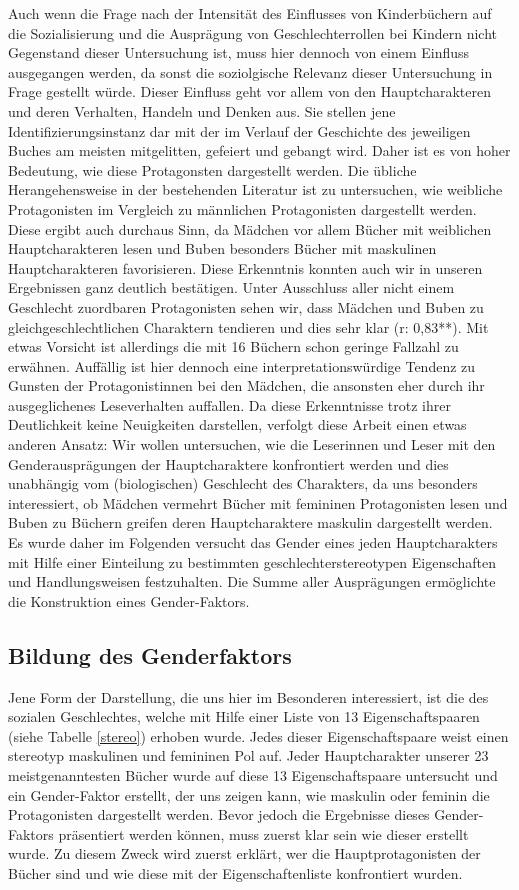 Auch wenn die Frage nach der Intensität des Einflusses von Kinderbüchern
auf die Sozialisierung und die Ausprägung von Geschlechterrollen bei
Kindern nicht Gegenstand dieser Untersuchung ist, muss hier dennoch von
einem Einfluss ausgegangen werden, da sonst die soziolgische Relevanz
dieser Untersuchung in Frage gestellt würde. Dieser Einfluss geht vor
allem von den Hauptcharakteren und deren Verhalten, Handeln und Denken
aus. Sie stellen jene Identifizierungsinstanz dar mit der im Verlauf der
Geschichte des jeweiligen Buches am meisten mitgelitten, gefeiert und
gebangt wird. Daher ist es von hoher Bedeutung, wie diese Protagonsten
dargestellt werden. Die übliche Herangehensweise in der bestehenden
Literatur ist zu untersuchen, wie weibliche Protagonisten im Vergleich
zu männlichen Protagonisten dargestellt werden. Diese ergibt auch
durchaus Sinn, da Mädchen vor allem Bücher mit weiblichen
Hauptcharakteren lesen und Buben besonders Bücher mit maskulinen
Hauptcharakteren favorisieren. Diese Erkenntnis konnten auch wir in
unseren Ergebnissen ganz deutlich bestätigen. Unter Ausschluss aller
nicht einem Geschlecht zuordbaren Protagonisten sehen wir, dass Mädchen
und Buben zu gleichgeschlechtlichen Charaktern tendieren und dies sehr
klar (r: 0,83**). Mit etwas Vorsicht ist allerdings die mit 16 Büchern
schon geringe Fallzahl zu erwähnen. Auffällig ist hier dennoch eine
interpretationswürdige Tendenz zu Gunsten der Protagonistinnen bei den
Mädchen, die ansonsten eher durch ihr ausgeglichenes Leseverhalten
auffallen. Da diese Erkenntnisse trotz ihrer Deutlichkeit keine
Neuigkeiten darstellen, verfolgt diese Arbeit einen etwas anderen
Ansatz: Wir wollen untersuchen, wie die Leserinnen und Leser mit den
Genderausprägungen der Hauptcharaktere konfrontiert werden und dies
unabhängig vom (biologischen) Geschlecht des Charakters, da uns
besonders interessiert, ob Mädchen vermehrt Bücher mit femininen
Protagonisten lesen und Buben zu Büchern greifen deren Hauptcharaktere
maskulin dargestellt werden. Es wurde daher im Folgenden versucht das
Gender eines jeden Hauptcharakters mit Hilfe einer Einteilung zu
bestimmten geschlechterstereotypen Eigenschaften und Handlungsweisen
festzuhalten. Die Summe aller Ausprägungen ermöglichte die Konstruktion
eines Gender-Faktors.

\subsection{Bildung des Genderfaktors}

Jene Form der Darstellung, die uns hier im Besonderen interessiert, ist
die des sozialen Geschlechtes, welche mit Hilfe einer Liste von 13
Eigenschaftspaaren (siehe Tabelle \ref{stereo}) erhoben wurde. Jedes
dieser Eigenschaftspaare weist einen stereotyp maskulinen und femininen
Pol auf. Jeder Hauptcharakter unserer 23 meistgenanntesten Bücher wurde
auf diese 13 Eigenschaftspaare untersucht und ein Gender-Faktor
erstellt, der uns zeigen kann, wie maskulin oder feminin die
Protagonisten dargestellt werden. Bevor jedoch die Ergebnisse dieses
Gender-Faktors präsentiert werden können, muss zuerst klar sein wie
dieser erstellt wurde. Zu diesem Zweck wird zuerst erklärt, wer die
Hauptprotagonisten der Bücher sind und wie diese mit der
Eigenschaftenliste konfrontiert wurden.

